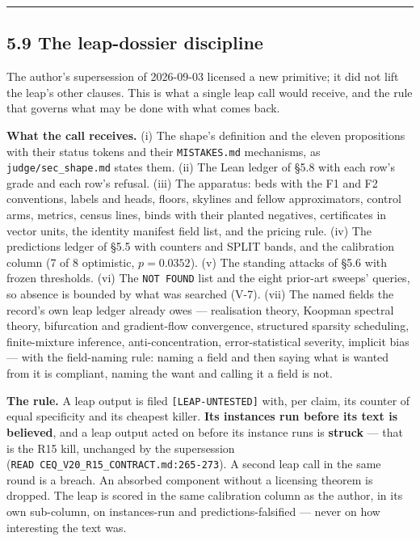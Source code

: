\documentclass[11pt,a4paper]{article}
\theoremstyle{plain}
\theoremstyle{definition}
\theoremstyle{remark}
\begin{document}
\begin{center}\rule{0.5\linewidth}{0.5pt}\end{center}

\subsection{5.9 The leap-dossier
discipline}\label{the-leap-dossier-discipline}

The author's supersession of 2026-09-03 licensed a new primitive; it did
not lift the leap's other clauses. This is what a single leap call would
receive, and the rule that governs what may be done with what comes
back.

\textbf{What the call receives.} (i) The shape's definition and the
eleven propositions with their status tokens and their
\texttt{MISTAKES.md} mechanisms, as \texttt{judge/sec\_shape.md} states
them. (ii) The Lean ledger of §5.8 with each row's grade and each row's
refusal. (iii) The apparatus: beds with the F1 and F2 conventions,
labels and heads, floors, skylines and fellow approximators, control
arms, metrics, census lines, binds with their planted negatives,
certificates in vector units, the identity manifest field list, and the
pricing rule. (iv) The predictions ledger of §5.5 with counters and
SPLIT bands, and the calibration column (7 of 8 optimistic,
\(p=0.0352\)). (v) The standing attacks of §5.6 with frozen thresholds.
(vi) The \texttt{NOT\ FOUND} list and the eight prior-art sweeps'
queries, so absence is bounded by what was searched (V-7). (vii) The
named fields the record's own leap ledger already owes --- realisation
theory, Koopman spectral theory, bifurcation and gradient-flow
convergence, structured sparsity scheduling, finite-mixture inference,
anti-concentration, error-statistical severity, implicit bias --- with
the field-naming rule: naming a field and then saying what is wanted
from it is compliant, naming the want and calling it a field is not.

\textbf{The rule.} A leap output is filed \texttt{{[}LEAP-UNTESTED{]}}
with, per claim, its counter of equal specificity and its cheapest
killer. \textbf{Its instances run before its text is believed}, and a
leap output acted on before its instance runs is \textbf{struck} ---
that is the R15 kill, unchanged by the supersession
(\texttt{READ\ CEQ\_V20\_R15\_CONTRACT.md:265-273}). A second leap call
in the same round is a breach. An absorbed component without a licensing
theorem is dropped. The leap is scored in the same calibration column as
the author, in its own sub-column, on instances-run and
predictions-falsified --- never on how interesting the text was.
\end{document}
